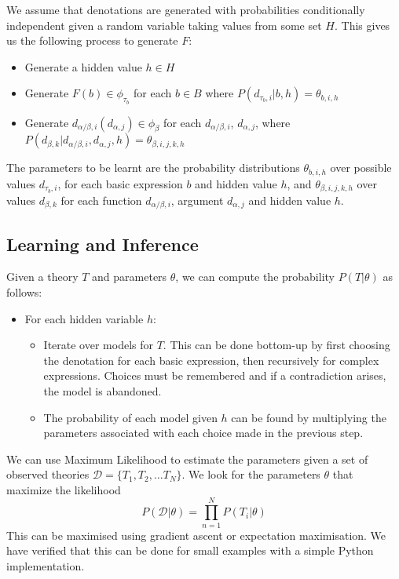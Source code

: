 \documentclass[a4paper,11pt]{article}
\theoremstyle{definition}
\newcommand{\interp}[1]{[\![ #1 ]\!]}
\begin{document}
We assume that denotations are generated with probabilities
conditionally independent given a random variable taking values from
some set $H$. This gives us the following process to generate $F$:
\begin{itemize}
\item Generate a hidden value $h\in H$
\item Generate $F(b) \in \phi_{\tau_b}$ for each $b\in B$ where
  $P(d_{\tau_b,i}|b, h) = \theta_{b,i,h}$
\item Generate $d_{\alpha/\beta,i}(d_{\alpha,j}) \in \phi_\beta$ for each $d_{\alpha/\beta,i}$, $d_{\alpha,j}$,
where $P(d_{\beta,k}|d_{\alpha/\beta,i}, d_{\alpha,j},h) = \theta_{\beta,i,j,k,h}$
\end{itemize}
The parameters to be learnt are the probability distributions
$\theta_{b,i,h}$ 
over possible values $d_{\tau_b,i}$,
for each basic expression $b$ and hidden value $h$,
and $\theta_{\beta,i,j,k,h}$ over
values $d_{\beta,k}$ for each function $d_{\alpha/\beta,i}$, argument
$d_{\alpha,j}$ and hidden value $h$.

\subsection{Learning and Inference}

Given a theory $T$ and parameters $\theta$, we can compute the
probability $P(T|\theta)$ as follows:
\begin{itemize}
\item For each hidden variable $h$:
\begin{itemize}
\item Iterate over models for $T$. This can be done bottom-up
  by first choosing the denotation for each basic expression,
  then recursively for complex expressions. Choices must be
  remembered and if a contradiction arises, the
  model is abandoned.
\item The probability of each model given $h$ can be found by
  multiplying the parameters associated with each choice made in the
  previous step.
\end{itemize}
\end{itemize}

We can use Maximum Likelihood to estimate the parameters given a set
of observed theories $\mathcal{D} = \{T_1, T_2, \ldots T_N\}$. We look
for the parameters $\theta$ that maximize the likelihood
$$P(\mathcal{D}|\theta) = \prod_{n=1}^N P(T_i|\theta)$$ This can be
maximised using gradient ascent or expectation maximisation. We have
verified that this can be done for small examples with a simple Python
implementation.
\end{document}
